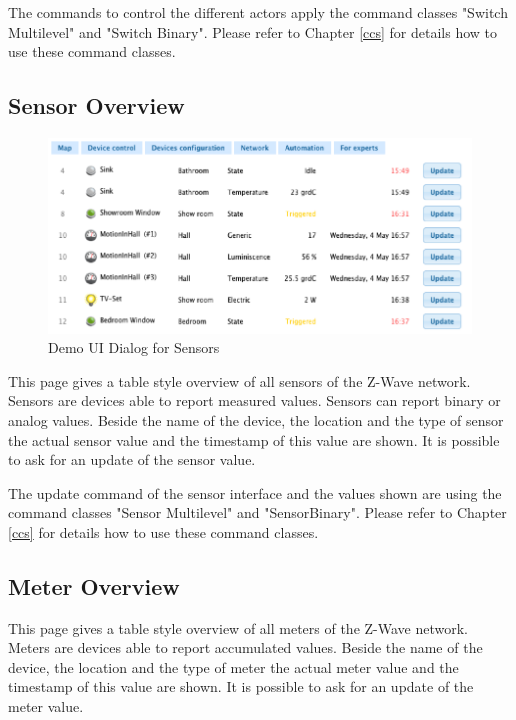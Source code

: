 The commands to control the different actors apply the  command classes "Switch Multilevel" and "Switch 
Binary". Please refer to Chapter \ref{ccs} for details how to use these command classes.


\subsection{Sensor Overview}


\begin{figure} 
\begin{center}
\includegraphics[scale=0.5]{pics/sensors.png}
\caption{Demo UI Dialog for Sensors}
\label{c3:demosensor} 
\end{center}
 \end{figure}

 This page gives a table style overview of all sensors of the Z-Wave network.  
Sensors are devices able to report measured values. Sensors can report binary or analog values.  Beside the name of the device, the location and the type of sensor the actual sensor value and the timestamp of this value are shown. It is possible to ask for an update of the sensor value.

 
 
The update command of the sensor interface and  the values shown are using the command classes "Sensor Multilevel" and "SensorBinary". Please refer to Chapter \ref{ccs} for details how to use these command classes.
 
\subsection{Meter Overview}

This page gives a table style overview of all meters of the Z-Wave network.  
Meters are devices able to report accumulated values.  Beside the name of the device, the location and the type of meter the actual meter value and the timestamp of this value are shown. It is possible to ask for an update of the meter value.
 
